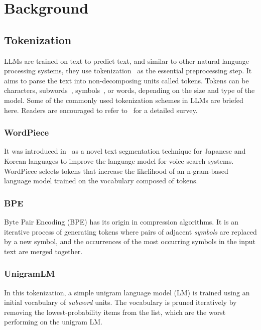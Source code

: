 \section{Background}
\label{sec:Background}
\subsection{Tokenization}
\label{ss:tokenization}
LLMs are trained on text to predict text, and similar to other natural language processing systems, they use tokenization~\cite{webster1992tokenization} as the essential preprocessing step. It aims to parse the text into non-decomposing units called tokens. Tokens can be characters, subwords~\cite{unigramLM}, symbols~\cite{bpe}, or words, depending on the size and type of the model. Some of the commonly used tokenization schemes in LLMs are briefed here. Readers are encouraged to refer to~\cite{tokenizationsurvey} for a detailed survey.

\subsubsection{WordPiece~\cite{wordpiece}}
\label{ss:wordpiece}
It was introduced in~\cite{wordpiece} as a novel text segmentation technique for Japanese and Korean languages to improve the language model for voice search systems. WordPiece selects tokens that increase the likelihood of an n-gram-based language model trained on the vocabulary composed of tokens.

\subsubsection{BPE~\cite{bpe}}
\label{ss:bpe}
Byte Pair Encoding (BPE) has its origin in compression algorithms. It is an iterative process of generating tokens where pairs of adjacent \textit{symbols} are replaced by a new symbol, and the occurrences of the most occurring symbols in the input text are merged together.

\subsubsection{UnigramLM~\cite{unigramLM}}
\label{ss:unigramLM}
In this tokenization, a simple unigram language model (LM) is trained using an initial vocabulary of \textit{subword} units. The vocabulary is pruned iteratively by removing the lowest-probability items from the list, which are the worst performing on the unigram LM.

